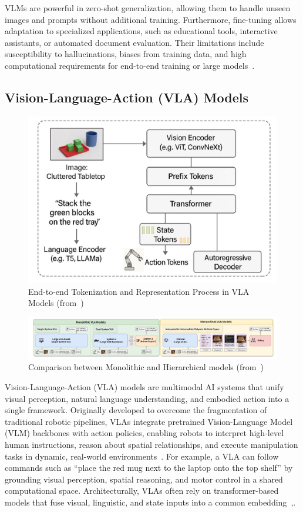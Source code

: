 \documentclass[12pt]{extarticle}
\begin{document}
VLMs are powerful in zero-shot generalization, allowing them to handle unseen images and prompts without additional training. Furthermore, fine-tuning allows adaptation to specialized applications, such as educational tools, interactive assistants, or automated document evaluation. Their limitations include susceptibility to hallucinations, biases from training data, and high computational requirements for end-to-end training or large models~\cite{huggingface_vlms_2024}.
\subsection{Vision-Language-Action (VLA) Models}

\begin{figure}[htbp]
    \centering
    \includegraphics[width=0.8\linewidth]{images/vla.png}
    \caption{End-to-end Tokenization and Representation Process in VLA Models (from~\cite{vla})}
    \label{fig:vla}
\end{figure}

\begin{figure}[h]
    \centering
    \includegraphics[width=\linewidth]{images/vla-in-robot.png}
    \caption{Comparison between Monolithic and Hierarchical models (from~\cite{vla-in-robot})}
    \label{fig:vla-in-robot}
\end{figure}

Vision-Language-Action (VLA) models are multimodal AI systems that unify visual perception, natural language understanding, and embodied action into a single framework. Originally developed to overcome the fragmentation of traditional robotic pipelines, VLAs integrate pretrained Vision-Language Model (VLM) backbones with action policies, enabling robots to interpret high-level human instructions, reason about spatial relationships, and execute manipulation tasks in dynamic, real-world environments~\cite{vla}. For example, a VLA can follow commands such as “place the red mug next to the laptop onto the top shelf” by grounding visual perception, spatial reasoning, and motor control in a shared computational space. Architecturally, VLAs often rely on transformer-based models that fuse visual, linguistic, and state inputs into a common embedding~\cite{vla},\cite{vla-in-robot}.
\end{document}
